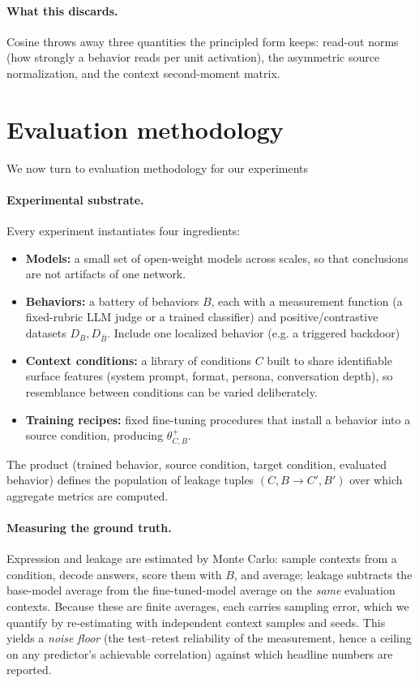 \documentclass[11pt]{article}
\theoremstyle{definition}
\theoremstyle{definition}
\theoremstyle{assumptionstyle}
\begin{document}
\paragraph{What this discards.} Cosine throws away three quantities the principled form
keeps: read-out norms (how strongly a behavior reads per unit activation), the asymmetric
source normalization, and the context second-moment matrix.

\section{Evaluation methodology}
\label{sec:evaluation}
We now turn to evaluation methodology for our experiments
\paragraph{Experimental substrate.}
Every experiment instantiates four ingredients:
\begin{itemize}
  \item \textbf{Models:} a small set of open-weight models across scales, so that
        conclusions are not artifacts of one network.
  \item \textbf{Behaviors:} a battery of behaviors $B$, each with a measurement
        function (a fixed-rubric LLM judge or a trained classifier) and
        positive/contrastive datasets $D_B,D_{\bar B}$. Include one localized behavior (e.g. a triggered backdoor)
  \item \textbf{Context conditions:} a library of conditions $C$ built to share
        identifiable surface features (system prompt, format, persona, conversation
        depth), so resemblance between conditions can be varied deliberately.
  \item \textbf{Training recipes:} fixed fine-tuning procedures that install a
        behavior into a source condition, producing $\theta^+_{C,B}$.
\end{itemize}
The product (trained behavior, source condition, target condition, evaluated
behavior) defines the population of leakage tuples $(C,B\!\to\!C',B')$ over
which aggregate metrics are computed.
\paragraph{Measuring the ground truth.}
Expression and leakage are estimated by Monte Carlo: sample contexts from a
condition, decode answers, score them with $B$, and average; leakage subtracts the
base-model average from the fine-tuned-model average on the \emph{same} evaluation
contexts. Because these are finite averages, each carries sampling error, which we
quantify by re-estimating with independent context samples and seeds. This yields a
\emph{noise floor} (the test--retest reliability of the measurement, hence a
ceiling on any predictor's achievable correlation) against which headline numbers
are reported.
\end{document}
